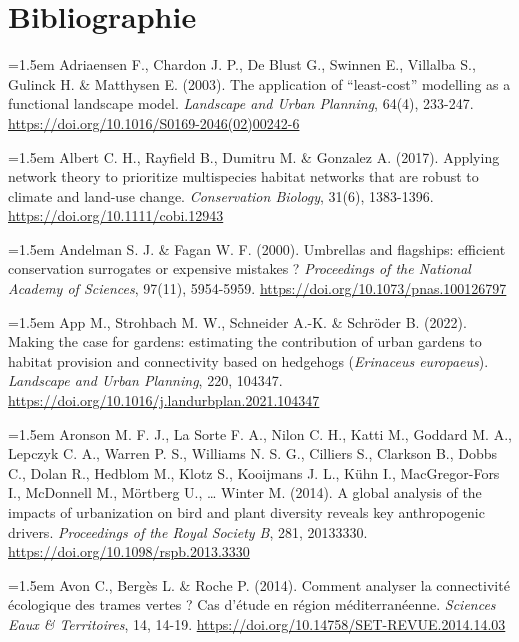 \documentclass[a4paper,12pt]{report}
\begin{document}
\chapter*{Bibliographie}

\setlength{\parindent}{0pt}
\noindent\hangindent=1.5em Adriaensen F., Chardon J. P., De Blust G., Swinnen E., Villalba S., Gulinck H. \& Matthysen E. (2003). The application of ``least-cost'' modelling as a functional landscape model. \textit{Landscape and Urban Planning}, 64(4), 233-247. \url{https://doi.org/10.1016/S0169-2046(02)00242-6}\par\medskip
\noindent\hangindent=1.5em Albert C. H., Rayfield B., Dumitru M. \& Gonzalez A. (2017). Applying network theory to prioritize multispecies habitat networks that are robust to climate and land-use change. \textit{Conservation Biology}, 31(6), 1383-1396. \url{https://doi.org/10.1111/cobi.12943}\par\medskip
\noindent\hangindent=1.5em Andelman S. J. \& Fagan W. F. (2000). Umbrellas and flagships: efficient conservation surrogates or expensive mistakes ? \textit{Proceedings of the National Academy of Sciences}, 97(11), 5954-5959. \url{https://doi.org/10.1073/pnas.100126797}\par\medskip
\noindent\hangindent=1.5em App M., Strohbach M. W., Schneider A.-K. \& Schröder B. (2022). Making the case for gardens: estimating the contribution of urban gardens to habitat provision and connectivity based on hedgehogs (\textit{Erinaceus europaeus}). \textit{Landscape and Urban Planning}, 220, 104347. \url{https://doi.org/10.1016/j.landurbplan.2021.104347}\par\medskip
\noindent\hangindent=1.5em Aronson M. F. J., La Sorte F. A., Nilon C. H., Katti M., Goddard M. A., Lepczyk C. A., Warren P. S., Williams N. S. G., Cilliers S., Clarkson B., Dobbs C., Dolan R., Hedblom M., Klotz S., Kooijmans J. L., Kühn I., MacGregor-Fors I., McDonnell M., Mörtberg U., … Winter M. (2014). A global analysis of the impacts of urbanization on bird and plant diversity reveals key anthropogenic drivers. \textit{Proceedings of the Royal Society B}, 281, 20133330. \url{https://doi.org/10.1098/rspb.2013.3330}\par\medskip
\noindent\hangindent=1.5em Avon C., Bergès L. \& Roche P. (2014). Comment analyser la connectivité écologique des trames vertes ? Cas d'étude en région méditerranéenne. \textit{Sciences Eaux \& Territoires}, 14, 14-19. \url{https://doi.org/10.14758/SET-REVUE.2014.14.03}\par\medskip
\end{document}
